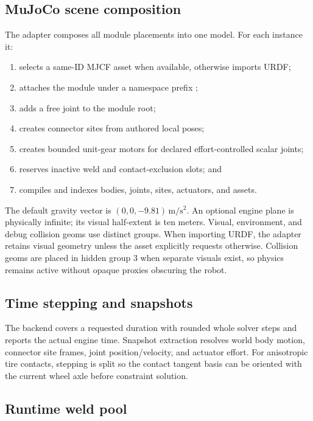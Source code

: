 \subsection{MuJoCo scene composition}

The \mujoco{} adapter composes all module placements into one model. For each instance
it:

\begin{enumerate}
  \item selects a same-ID MJCF asset when available, otherwise imports URDF;
  \item attaches the module under a namespace prefix ;
  \item adds a free joint to the module root;
  \item creates connector sites from authored local poses;
  \item creates bounded unit-gear motors for declared effort-controlled scalar joints;
  \item reserves inactive weld and contact-exclusion slots; and
  \item compiles and indexes bodies, joints, sites, actuators, and assets.
\end{enumerate}

The default gravity vector is $(0,0,-9.81)\,\mathrm{m/s^2}$. An optional engine plane is
physically infinite; its visual half-extent is ten meters. Visual, environment, and
debug collision geoms use distinct groups. When importing URDF, the adapter retains
visual geometry unless the asset explicitly requests otherwise. Collision geoms are
placed in hidden group 3 when separate visuals exist, so physics remains active without
opaque proxies obscuring the robot.

\subsection{Time stepping and snapshots}

The backend covers a requested duration with rounded whole solver steps and reports the
actual engine time. Snapshot extraction resolves world body motion, connector site
frames, joint position/velocity, and actuator effort. For anisotropic \smoresep{} tire
contacts, stepping is split so the contact tangent basis can be oriented with the
current wheel axle before constraint solution.

\subsection{Runtime weld pool}

